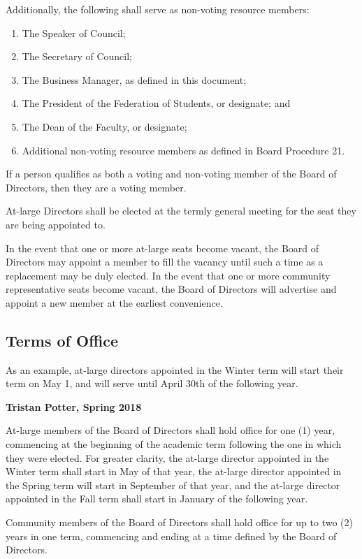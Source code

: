 \noindent Additionally, the following shall serve as non-voting resource
members:
\begin{enumerate}
  \item The Speaker of Council;
  \item The Secretary of Council;
  \item The Business Manager, as defined in this document;
  \item The President of the Federation of Students, or designate; and
  \item The Dean of the Faculty, or designate;
  \item Additional non-voting resource members as defined in Board Procedure 21.
\end{enumerate}

If a person qualifies as both a voting and non-voting member of the Board of 
Directors, then they are a voting member.

At-large Directors shall be elected at the termly general meeting for the
seat they are being appointed to.

In the event that one or more at-large seats become vacant, the Board of
Directors may appoint a member to fill the vacancy until such a time as a
replacement may be duly elected. In the event that one or more community representative seats become vacant, the Board of Directors will advertise and appoint a new member at the earliest convenience.


\subsection{Terms of Office}
\begin{annotation}
    As an example, at-large directors appointed in the Winter term will start
    their term on May 1, and will serve until April 30th of the following year.

    \textbf{Tristan Potter, Spring 2018}
\end{annotation}
At-large members of the Board of Directors shall hold office for one (1) year,
commencing at the beginning of the academic term following the one in which
they were elected. For greater clarity, the at-large director appointed in
the Winter term shall start in May of that year, the at-large director 
appointed in the Spring term will start in September of that year, and the
at-large director appointed in the Fall term shall start in January of the 
following year. 

Community members of the Board of Directors shall hold office for up to two (2)
years in one term, commencing and ending at a time defined by the Board of
Directors.

